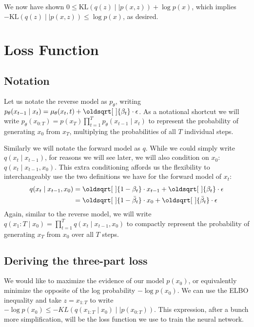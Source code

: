 \documentclass[11pt,dvipsnames]{article}
\renewcommand*{\sqrt}[2][\ ]{\oldsqrt[#1]{#2}}
\begin{document}
We now have shown $0 \le \text{KL}(q(z) \mid\mid p(x, z)) + \log p(x)$, which implies $-\text{KL}(q(z) \mid\mid p(x, z)) \le \log p(x)$, as desired.

\section{Loss Function}
\subsection{Notation}
Let us notate the reverse model as $p_\theta$, writing
$p_\theta(x_{t-1} \mid x_t) = \mu_\theta(x_t, t) + \sqrt{\beta_t} \cdot \epsilon$.
As a notational shortcut we will write $p_\theta(x_{0:T}) = p(x_T) \prod_{t=1}^T p_\theta(x_{t-1} \mid x_t)$
to represent the probability of generating $x_0$ from $x_T$, multiplying the probabilities of all $T$
individual steps.

Similarly we will notate the forward model as $q$. While we could simply write
$q(x_t \mid x_{t-1})$, for reasons we will see later, we will also condition on $x_0$:
$q(x_t \mid x_{t-1}, x_0)$. This extra conditioning affords us the flexibility to interchangeably use
the two definitions we have for the forward model of $x_t$:
\begin{equation*}
\begin{split}
q(x_t \mid x_{t-1}, x_0) &= \sqrt{1 - \beta_t} \cdot x_{t-1} + \sqrt{\beta_t} \cdot \epsilon \\
&= \sqrt{1 - \bar\beta_t} \cdot x_0 + \sqrt{\bar\beta_t} \cdot \epsilon
\end{split}
\end{equation*}
Again, similar to the reverse model, we will write $q(x_1:T \mid x_0) = \prod_{t=1}^T q(x_t \mid x_{t-1}, x_0)$
to compactly represent the probability of generating $x_T$ from $x_0$ over all $T$ steps.

\subsection{Deriving the three-part loss}
\label{sec:threepartloss}
We would like to maximize the evidence of our model $p(x_0)$, or equivalently minimize the
opposite of the log probability $-\log p(x_0)$.
We can use the ELBO inequality and take $z = x_{1:T}$ to write
$-\log p(x_0) \le -KL(q(x_{1:T} \mid x_0) \mid\mid p(x_{0:T}))$.
This expression, after a bunch more simplification, will be the loss function we use to train
the neural network.
\end{document}
